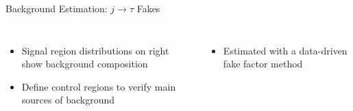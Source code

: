 \documentclass[aspectratio=169,xcolor=table]{beamer}
\begin{document}
  \begin{frame}[t]{Background Estimation: $j \rightarrow \tau$ Fakes}
    \begin{columns}[t]
        \vspace{-3.5cm}
        \begin{itemize}
          \item Signal region \Etm distributions on right show background composition
          \item Define control regions to verify main sources of background
        \end{itemize}
    \begin{table}[!thp]
    \end{table}
    \begin{itemize}
      \item Estimated with a data-driven fake factor method 
    \end{itemize}


\end{columns}
\end{frame}
\end{document}
